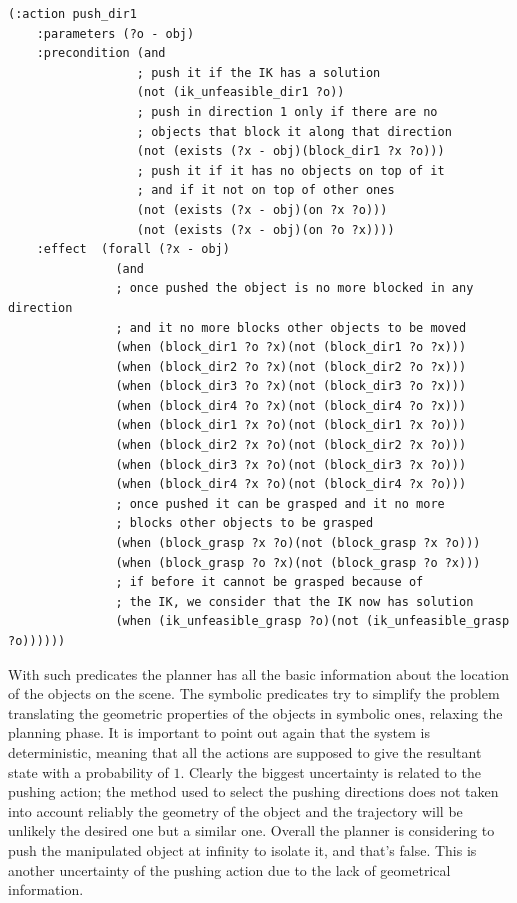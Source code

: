 \lstset{language=pddl}
\begin{lstlisting}[caption={PDDL syntax of the pushing action along direction 1},label=pushPDDL]
(:action push_dir1
    :parameters (?o - obj)
    :precondition (and
                  ; push it if the IK has a solution
                  (not (ik_unfeasible_dir1 ?o)) 
                  ; push in direction 1 only if there are no
                  ; objects that block it along that direction
                  (not (exists (?x - obj)(block_dir1 ?x ?o)))
                  ; push it if it has no objects on top of it
                  ; and if it not on top of other ones
                  (not (exists (?x - obj)(on ?x ?o)))
                  (not (exists (?x - obj)(on ?o ?x))))
    :effect  (forall (?x - obj)
               (and
               ; once pushed the object is no more blocked in any direction
               ; and it no more blocks other objects to be moved
               (when (block_dir1 ?o ?x)(not (block_dir1 ?o ?x)))
               (when (block_dir2 ?o ?x)(not (block_dir2 ?o ?x)))
               (when (block_dir3 ?o ?x)(not (block_dir3 ?o ?x)))
               (when (block_dir4 ?o ?x)(not (block_dir4 ?o ?x)))
               (when (block_dir1 ?x ?o)(not (block_dir1 ?x ?o)))
               (when (block_dir2 ?x ?o)(not (block_dir2 ?x ?o)))
               (when (block_dir3 ?x ?o)(not (block_dir3 ?x ?o)))
               (when (block_dir4 ?x ?o)(not (block_dir4 ?x ?o)))
               ; once pushed it can be grasped and it no more
               ; blocks other objects to be grasped
               (when (block_grasp ?x ?o)(not (block_grasp ?x ?o)))
               (when (block_grasp ?o ?x)(not (block_grasp ?o ?x)))
               ; if before it cannot be grasped because of 
               ; the IK, we consider that the IK now has solution
               (when (ik_unfeasible_grasp ?o)(not (ik_unfeasible_grasp ?o))))))
\end{lstlisting}

\mbox{}


With such predicates the planner has all the basic information about the location of the objects on the scene. The symbolic predicates try to simplify the problem translating the geometric properties of the objects in symbolic ones, relaxing the planning phase. It is important to point out again that the system is deterministic, meaning that all the actions are supposed to give the resultant state with a probability of $1$. Clearly the biggest uncertainty is related to the pushing action; the method used to select the pushing directions does not taken into account reliably the geometry of the object and the trajectory will be unlikely the desired one but a similar one. Overall the planner is considering to push the manipulated object at infinity to isolate it, and that's false. This is another uncertainty of the pushing action due to the lack of geometrical information.
 
